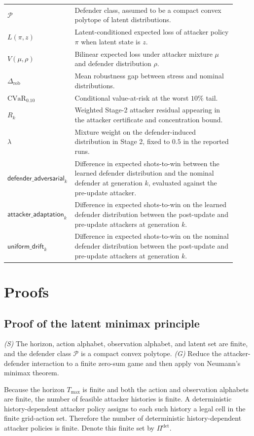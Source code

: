\documentclass[11pt]{article}
\newcommand{\Pset}{\mathcal{P}}
\newcommand{\Gap}{\Delta_{\mathrm{rob}}}
\newcommand{\cvar}{\mathrm{CVaR}}
\begin{document}
\begin{longtable}{p{0.22\linewidth}p{0.70\linewidth}}
$\Pset$ & Defender class, assumed to be a compact convex polytope of latent distributions. \\
$L(\pi,z)$ & Latent-conditioned expected loss of attacker policy $\pi$ when latent state is $z$. \\
$V(\mu,\rho)$ & Bilinear expected loss under attacker mixture $\mu$ and defender distribution $\rho$. \\
$\Gap$ & Mean robustness gap between stress and nominal distributions. \\
$\cvar_{0.10}$ & Conditional value-at-risk at the worst $10\%$ tail. \\
$R_k$ & Weighted Stage-2 attacker residual appearing in the attacker certificate and concentration bound. \\
$\lambda$ & Mixture weight on the defender-induced distribution in Stage 2, fixed to $0.5$ in the reported runs. \\
$\textsf{defender\_adversarial}_k$ & Difference in expected shots-to-win between the learned defender distribution and the nominal defender at generation $k$, evaluated against the pre-update attacker. \\
$\textsf{attacker\_adaptation}_k$ & Difference in expected shots-to-win on the learned defender distribution between the post-update and pre-update attackers at generation $k$. \\
$\textsf{uniform\_drift}_k$ & Difference in expected shots-to-win on the nominal defender distribution between the post-update and pre-update attackers at generation $k$. \\
\bottomrule
\end{longtable}

\section{Proofs}

\subsection{Proof of the latent minimax principle}

\noindent\textit{(S)} The horizon, action alphabet, observation alphabet, and latent set are finite, and the defender class $\Pset$ is a compact convex polytope. \textit{(G)} Reduce the attacker-defender interaction to a finite zero-sum game and then apply von Neumann's minimax theorem.

Because the horizon $T_{\max}$ is finite and both the action and observation alphabets are finite, the number of feasible attacker histories is finite. A deterministic history-dependent attacker policy assigns to each such history a legal cell in the finite grid-action set. Therefore the number of deterministic history-dependent attacker policies is finite. Denote this finite set by $\Pi^{\det}$.
\end{document}
